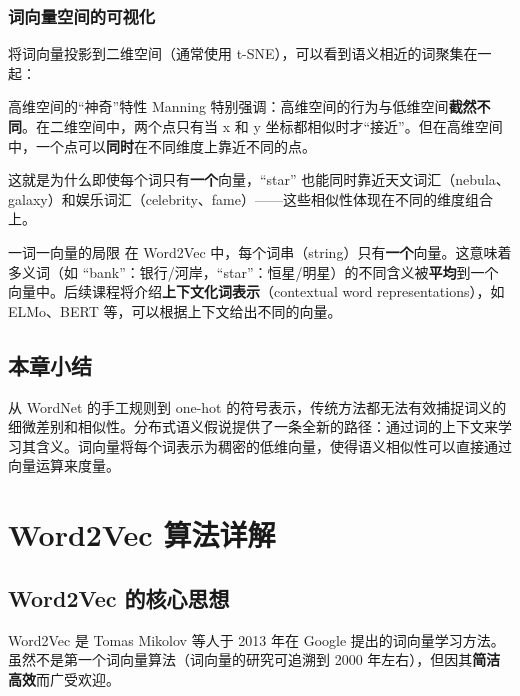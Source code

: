 \documentclass[a4paper]{article}
\begin{document}
\subsubsection{词向量空间的可视化}

将词向量投影到二维空间（通常使用 t-SNE），可以看到语义相近的词聚集在一起：





\begin{knowledgebox}{高维空间的``神奇''特性}
Manning 特别强调：高维空间的行为与低维空间\textbf{截然不同}。在二维空间中，两个点只有当 x 和 y 坐标都相似时才``接近''。但在高维空间中，一个点可以\textbf{同时}在不同维度上靠近不同的点。

这就是为什么即使每个词只有\textbf{一个}向量，``star'' 也能同时靠近天文词汇（nebula、galaxy）和娱乐词汇（celebrity、fame）——这些相似性体现在不同的维度组合上。
\end{knowledgebox}

\begin{warningbox}{一词一向量的局限}
在 Word2Vec 中，每个词串（string）只有\textbf{一个}向量。这意味着多义词（如 ``bank''：银行/河岸，``star''：恒星/明星）的不同含义被\textbf{平均}到一个向量中。后续课程将介绍\textbf{上下文化词表示}（contextual word representations），如 ELMo、BERT 等，可以根据上下文给出不同的向量。
\end{warningbox}

\subsection{本章小结}

从 WordNet 的手工规则到 one-hot 的符号表示，传统方法都无法有效捕捉词义的细微差别和相似性。分布式语义假说提供了一条全新的路径：通过词的上下文来学习其含义。词向量将每个词表示为稠密的低维向量，使得语义相似性可以直接通过向量运算来度量。


\section{Word2Vec 算法详解}

\subsection{Word2Vec 的核心思想}

Word2Vec 是 Tomas Mikolov 等人于 2013 年在 Google 提出的词向量学习方法。虽然不是第一个词向量算法（词向量的研究可追溯到 2000 年左右），但因其\textbf{简洁高效}而广受欢迎。
\end{document}
